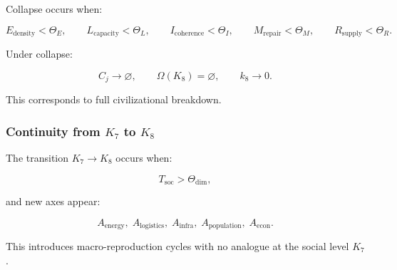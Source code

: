 Collapse occurs when:

\[
  E_{\mathrm{density}} < \Theta_E,\qquad
  L_{\mathrm{capacity}} < \Theta_L,\qquad
  I_{\mathrm{coherence}} < \Theta_I,\qquad
  M_{\mathrm{repair}} < \Theta_M,\qquad
  R_{\mathrm{supply}} < \Theta_R.
\]

Under collapse:

\[
  C_j \to \varnothing,\qquad
  \Omega(K_8)=\varnothing,\qquad
  k_8\to 0.
\]

This corresponds to full civilizational breakdown.

\subsubsection{Continuity from \texorpdfstring{$K_7$}{K_7} to \texorpdfstring{$K_8$}{K_8}}

The transition $K_7\to K_8$ occurs when:

\[
  T_{\mathrm{soc}} > \Theta_{\mathrm{dim}},
\]

and new axes appear:

\[
  A_{\mathrm{energy}},\;
  A_{\mathrm{logistics}},\;
  A_{\mathrm{infra}},\;
  A_{\mathrm{population}},\;
  A_{\mathrm{econ}}.
\]

This introduces macro-reproduction cycles with no analogue at the social level
$K_7$.

